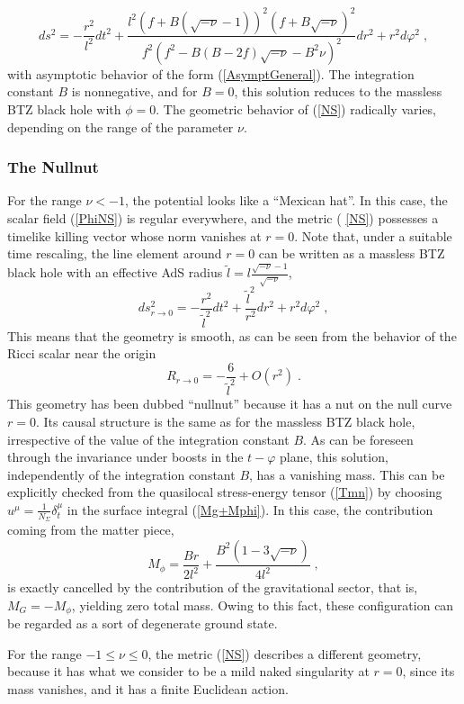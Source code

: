 \documentclass[a4paper,12pt]{article}
\begin{document}
\begin{equation}
ds^{2}=-\frac{r^{2}}{l^{2}}dt^{2}+\frac{l^{2}(f+B(\sqrt{-\nu }-1))^{2}(f+B%
\sqrt{-\nu })^{2}}{f^{2}(f^{2}-B(B-2f)\sqrt{-\nu }-B^{2}\nu )^{2}}%
dr^{2}+r^{2}d\varphi ^{2}\;,  \label{NS}
\end{equation}
with asymptotic behavior of the form (\ref{AsymptGeneral}). The
integration constant $B$ is nonnegative, and for $B=0$, this solution
reduces to the massless BTZ black hole with $\phi =0$. The geometric
behavior of (\ref{NS}) radically varies, depending on the range of the
parameter $\nu $.

\subsubsection{The Nullnut} \label{nullnutsec}

For the range $\nu <-1$, the potential looks like a ``Mexican hat''. In this
case, the scalar field (\ref{PhiNS}) is regular everywhere, and the metric (%
\ref{NS}) possesses a timelike killing vector whose norm vanishes at $r=0$.
Note that, under a suitable time rescaling, the line element around $r=0$
can be written as a massless BTZ black hole with an effective AdS radius $%
\tilde{l}=l\frac{\sqrt{-\nu }-1}{\sqrt{-\nu }}$, 
\[
ds_{r\rightarrow 0}^{2}=-\frac{r^{2}}{\tilde{l}^{2}}dt^{2}+\frac{\tilde{l}%
^{2}}{r^{2}}dr^{2}+r^{2}d\varphi ^{2}\;,
\]
This means that the geometry is smooth, as can be seen from the behavior of
the Ricci scalar near the origin 
\[
R_{r\rightarrow 0}=-\frac{6}{\tilde{l}^{2}}+O(r^{2})\;.
\]
This geometry has been dubbed ``nullnut'' because it has a nut  on the null
curve $r=0$. Its causal structure is the same as for the massless BTZ black
hole, irrespective of the value of the integration constant $B$. As can be
foreseen through the invariance under boosts in the $t-\varphi $ plane, this
solution, independently of the integration constant $B$, has a vanishing
mass. This can be explicitly checked from the quasilocal stress-energy
tensor (\ref{Tmn}) by choosing $u^{\mu }=\frac{1}{N_{\Sigma }}\delta
_{t}^{\mu }$ in the surface integral (\ref{Mg+Mphi}). In this case, the
contribution coming from the matter piece, 
\[
M_{\phi }=\frac{Br}{2l^{2}}+\frac{B^{2}(1-3\sqrt{-\nu })}{4l^{2}}\;,
\]
is exactly cancelled by the contribution of the gravitational sector, that
is, $M_{G}=-M_{\phi }$, yielding zero total mass. Owing to this
fact, these configuration can be regarded as a sort of degenerate ground
state.

For the range $-1\leq \nu \leq 0$, the metric (\ref{NS}) describes a
different geometry, because it has what we consider to be a mild naked
singularity at $r=0$, since its mass vanishes, and it has a finite Euclidean
action.
\end{document}
